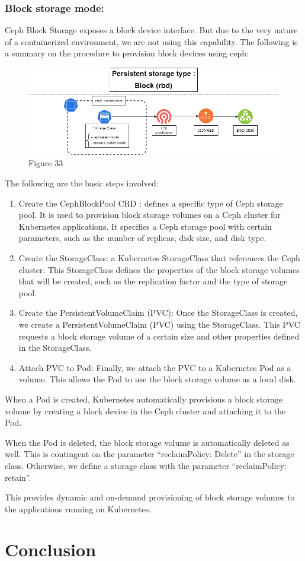 \subsubsection{Block storage mode: }

Ceph Block Storage exposes a block device interface. But due to the very nature of a containerized environment, we are not using this capability. The following is a summary on the procedure to provision block devices using ceph: 
\begin{figure}[H]\centering
\includegraphics[width=1.0\textwidth,angle=00]{assets/f33.png}
\caption{Figure 33 }
\label{fig:f33}
\end{figure}

The following are the basic steps involved: 
\begin{enumerate}[label = (\arabic*)]
\item Create the CephBlockPool CRD : defines a specific type of Ceph storage pool. It is used to provision block storage volumes on a Ceph cluster for Kubernetes applications. It specifies a Ceph storage pool with certain parameters, such as the number of replicas, disk size, and disk type. 
\item Create the StorageClass: a Kubernetes StorageClass that references the Ceph cluster. This StorageClass defines the properties of the block storage volumes that will be created, such as the replication factor and the type of storage pool. 
\item Create the PersistentVolumeClaim (PVC): Once the StorageClass is created, we create a PersistentVolumeClaim (PVC) using the StorageClass. This PVC requests a block storage volume of a certain size and other properties defined in the StorageClass. 
\item Attach PVC to Pod: Finally, we attach the PVC to a Kubernetes Pod as a volume. This allows the Pod to use the block storage volume as a local disk. 
\end{enumerate}
When a Pod is created, Kubernetes automatically provisions a block storage volume by creating a block device in the Ceph cluster and attaching it to the Pod. 

When the Pod is deleted, the block storage volume is automatically deleted as well. This is contingent on the parameter “reclaimPolicy: Delete” in the storage class. Otherwise, we define a storage class with the parameter “reclaimPolicy: retain”. 

This provides dynamic and on-demand provisioning of block storage volumes to the applications running on Kubernetes. 

\section*{Conclusion}
